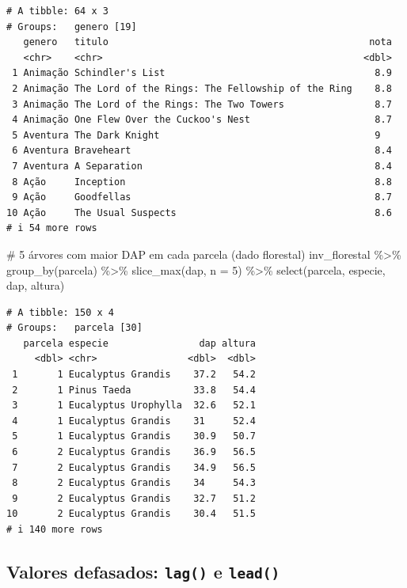 \documentclass[
  letterpaper,
]{scrbook}
\newenvironment{Shaded}{\begin{snugshade}}{\end{snugshade}}
\newcommand{\AttributeTok}[1]{\textcolor[rgb]{0.40,0.45,0.13}{#1}}
\newcommand{\CommentTok}[1]{\textcolor[rgb]{0.37,0.37,0.37}{#1}}
\newcommand{\DecValTok}[1]{\textcolor[rgb]{0.68,0.00,0.00}{#1}}
\newcommand{\FunctionTok}[1]{\textcolor[rgb]{0.28,0.35,0.67}{#1}}
\newcommand{\NormalTok}[1]{\textcolor[rgb]{0.00,0.23,0.31}{#1}}
\newcommand{\SpecialCharTok}[1]{\textcolor[rgb]{0.37,0.37,0.37}{#1}}
\begin{document}
\begin{verbatim}
# A tibble: 64 x 3
# Groups:   genero [19]
   genero   titulo                                              nota
   <chr>    <chr>                                              <dbl>
 1 Animação Schindler's List                                     8.9
 2 Animação The Lord of the Rings: The Fellowship of the Ring    8.8
 3 Animação The Lord of the Rings: The Two Towers                8.7
 4 Animação One Flew Over the Cuckoo's Nest                      8.7
 5 Aventura The Dark Knight                                      9  
 6 Aventura Braveheart                                           8.4
 7 Aventura A Separation                                         8.4
 8 Ação     Inception                                            8.8
 9 Ação     Goodfellas                                           8.7
10 Ação     The Usual Suspects                                   8.6
# i 54 more rows
\end{verbatim}

\begin{Shaded}
\begin{Highlighting}[]
\CommentTok{\# 5 árvores com maior DAP em cada parcela (dado florestal)}
\NormalTok{inv\_florestal }\SpecialCharTok{\%\textgreater{}\%} 
  \FunctionTok{group\_by}\NormalTok{(parcela) }\SpecialCharTok{\%\textgreater{}\%} 
  \FunctionTok{slice\_max}\NormalTok{(dap, }\AttributeTok{n =} \DecValTok{5}\NormalTok{) }\SpecialCharTok{\%\textgreater{}\%} 
  \FunctionTok{select}\NormalTok{(parcela, especie, dap, altura)}
\end{Highlighting}
\end{Shaded}

\begin{verbatim}
# A tibble: 150 x 4
# Groups:   parcela [30]
   parcela especie                dap altura
     <dbl> <chr>                <dbl>  <dbl>
 1       1 Eucalyptus Grandis    37.2   54.2
 2       1 Pinus Taeda           33.8   54.4
 3       1 Eucalyptus Urophylla  32.6   52.1
 4       1 Eucalyptus Grandis    31     52.4
 5       1 Eucalyptus Grandis    30.9   50.7
 6       2 Eucalyptus Grandis    36.9   56.5
 7       2 Eucalyptus Grandis    34.9   56.5
 8       2 Eucalyptus Grandis    34     54.3
 9       2 Eucalyptus Grandis    32.7   51.2
10       2 Eucalyptus Grandis    30.4   51.5
# i 140 more rows
\end{verbatim}

\subsection{\texorpdfstring{Valores defasados: \texttt{lag()} e
\texttt{lead()}}{Valores defasados: lag() e lead()}}\label{valores-defasados-lag-e-lead}
\end{document}
